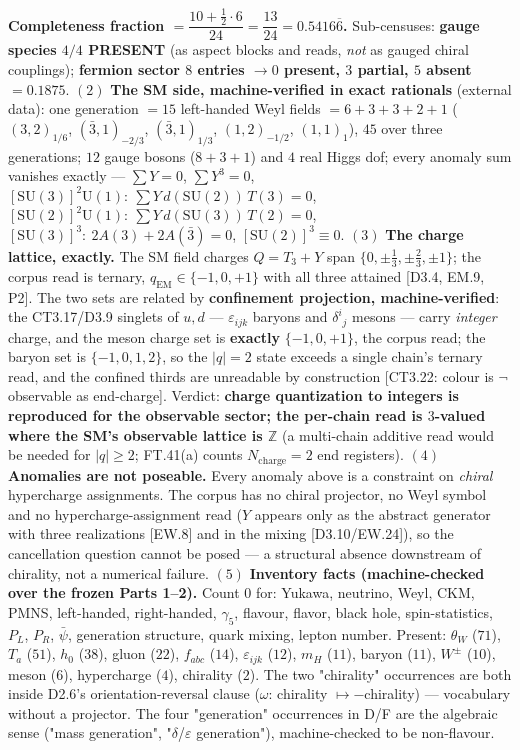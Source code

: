 \begin{theorem}
\textbf{Completeness fraction $=\dfrac{10+\frac12\cdot6}{24}=\dfrac{13}{24}=0.5416\overline6$.} Sub-censuses: \textbf{gauge species $4/4$ PRESENT} (as aspect blocks and reads, \textit{not} as gauged chiral couplings); \textbf{fermion sector $8$ entries $\to0$ present, $3$ partial, $5$ absent $=0.1875$}. $(2)$ \textbf{The SM side, machine-verified in exact rationals} (external data): one generation $=15$ left-handed Weyl fields $=6+3+3+2+1$ ($(3,2)_{1/6}$, $(\bar3,1)_{-2/3}$, $(\bar3,1)_{1/3}$, $(1,2)_{-1/2}$, $(1,1)_{1}$), $45$ over three generations; $12$ gauge bosons ($8+3+1$) and $4$ real Higgs dof; every anomaly sum vanishes exactly — $\sum Y=0$, $\sum Y^3=0$, $[\mathrm{SU}(3)]^2\mathrm U(1):\ \sum Y\,d(\mathrm{SU}(2))\,T(3)=0$, $[\mathrm{SU}(2)]^2\mathrm U(1):\ \sum Y\,d(\mathrm{SU}(3))\,T(2)=0$, $[\mathrm{SU}(3)]^3:\ 2A(3)+2A(\bar3)=0$, $[\mathrm{SU}(2)]^3\equiv0$. $(3)$ \textbf{The charge lattice, exactly.} The SM field charges $Q=T_3+Y$ span $\{0,\pm\tfrac13,\pm\tfrac23,\pm1\}$; the corpus read is ternary, $q_{\mathrm{EM}}\in\{-1,0,+1\}$ with all three attained [D3.4, EM.9, P2]. The two sets are related by \textbf{confinement projection, machine-verified}: the CT3.17/D3.9 singlets of $u,d$ — $\varepsilon_{ijk}$ baryons and $\delta^i{}_j$ mesons — carry \textit{integer} charge, and the meson charge set is \textbf{exactly} $\{-1,0,+1\}$, the corpus read; the baryon set is $\{-1,0,1,2\}$, so the $|q|=2$ state exceeds a single chain's ternary read, and the confined thirds are unreadable by construction [CT3.22: colour is $\neg$observable as end-charge]. Verdict: \textbf{charge quantization to integers is reproduced for the observable sector; the per-chain read is $3$-valued where the SM's observable lattice is $\mathbb Z$} (a multi-chain additive read would be needed for $|q|\ge2$; FT.41(a) counts $N_{\mathrm{charge}}=2$ end registers). $(4)$ \textbf{Anomalies are not poseable.} Every anomaly above is a constraint on \textit{chiral} hypercharge assignments. The corpus has no chiral projector, no Weyl symbol and no hypercharge-assignment read ($Y$ appears only as the abstract generator with three realizations [EW.8] and in the mixing [D3.10/EW.24]), so the cancellation question cannot be posed — a structural absence downstream of chirality, not a numerical failure. $(5)$ \textbf{Inventory facts (machine-checked over the frozen Parts 1–2).} Count $0$ for: Yukawa, neutrino, Weyl, CKM, PMNS, left-handed, right-handed, $\gamma_5$, flavour, flavor, black hole, spin-statistics, $P_L$, $P_R$, $\bar\psi$, generation structure, quark mixing, lepton number. Present: $\theta_W$ ($71$), $T_a$ ($51$), $h_0$ ($38$), gluon ($22$), $f_{abc}$ ($14$), $\varepsilon_{ijk}$ ($12$), $m_H$ ($11$), baryon ($11$), $W^\pm$ ($10$), meson ($6$), hypercharge ($4$), chirality ($2$). The two "chirality" occurrences are both inside D2.6's orientation-reversal clause ($\omega$: chirality $\mapsto-$chirality) — vocabulary without a projector. The four "generation" occurrences in D/F are the algebraic sense ("mass generation", "$\delta$/$\varepsilon$ generation"), machine-checked to be non-flavour.


\end{theorem}
